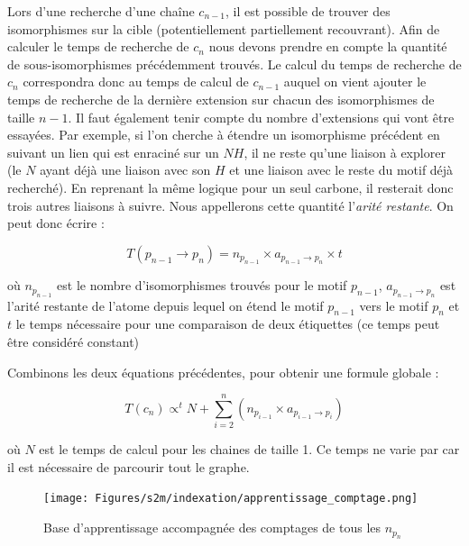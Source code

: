 Lors d'une recherche d'une chaîne $c_{n-1}$, il est possible de trouver des isomorphismes sur la cible (potentiellement partiellement recouvrant).
Afin de calculer le temps de recherche de $c_n$ nous devons prendre en compte la quantité de sous-isomorphismes précédemment trouvés.
Le calcul du temps de recherche de $c_n$ correspondra donc au temps de calcul de $c_{n-1}$ auquel on vient ajouter le temps de recherche de la dernière extension sur chacun des isomorphismes de taille $n-1$.
Il faut également tenir compte du nombre d'extensions qui vont être essayées.
Par exemple, si l'on cherche à étendre un isomorphisme précédent en suivant un lien qui est enraciné sur un $NH$, il ne reste qu'une liaison à explorer (le $N$ ayant déjà une liaison avec son $H$ et une liaison avec le reste du motif déjà recherché).
En reprenant la même logique pour un seul carbone, il resterait donc trois autres liaisons à suivre.
Nous appellerons cette quantité l'\textit{arité restante}.
On peut donc écrire :

\begin{equation}
 T(p_{n-1} \rightarrow p_n) = n_{p_{n-1}} \times a_{p_{n-1} \rightarrow p_n} \times t
\end{equation}

où $n_{p_{n-1}}$ est le nombre d'isomorphismes trouvés pour le motif $p_{n-1}$, $a_{p_{n-1} \rightarrow p_n}$ est l'arité restante
de l'atome depuis lequel on étend le motif $p_{n-1}$ vers le motif $p_n$ et $t$ le temps nécessaire pour une comparaison de deux
étiquettes (ce temps peut être considéré constant)

Combinons les deux équations précédentes, pour obtenir une formule globale :

\begin{equation}
 T(c_n) \propto^t N + \sum_{i=2}^n (n_{p_{i-1}} \times a_{p_{i-1} \rightarrow p_i})
\end{equation}

où $N$ est le temps de calcul pour les chaines de taille 1.
Ce temps ne varie par car il est nécessaire de parcourir tout le graphe.

\begin{figure}[!ht]
  \begin{center}
    \texttt{[image: Figures/s2m/indexation/apprentissage\_comptage.png]}
    \caption{\label{app_compt}Base d'apprentissage accompagnée des comptages de tous les $n_{p_{n}}$}
  \end{center}
\end{figure}

